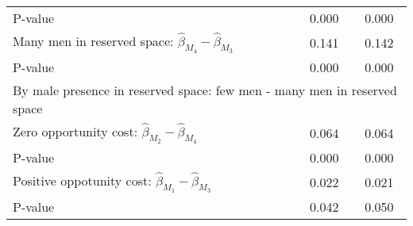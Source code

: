 \begin{tabular}{l*{2}{c}}
\quad P-value       &       0.000         &       0.000         \\
\quad Many men in reserved space: $\hat\beta_{M_4} - \hat\beta_{M_3}$ &       0.141         &       0.142         \\
\quad P-value       &       0.000         &       0.000         \\
\multicolumn{3}{l}{By male presence in reserved space: few men - many men in reserved space} \\ \quad Zero opportunity cost: $\hat\beta_{M_2} - \hat\beta_{M_4}$&       0.064         &       0.064         \\
\quad P-value       &       0.000         &       0.000         \\
\quad Positive oppotunity cost: $\hat\beta_{M_1} - \hat\beta_{M_3}$ &       0.022         &       0.021         \\
\quad P-value       &       0.042         &       0.050         \\
\hline\hline \end{tabular}

